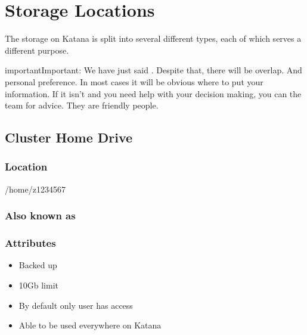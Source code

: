 \documentclass[letterpaper,10pt,english]{sphinxmanual}
\begin{document}
\section{Storage Locations}
\label{\detokenize{storage/storage_locations:storage-locations}}\label{\detokenize{storage/storage_locations::doc}}
The storage on Katana is split into several different types, each of which serves a different purpose.

\begin{sphinxadmonition}{important}{Important:}
We have just said . Despite that, there will be overlap. And personal preference. In most cases it will be obvious where to put your information. If it isn’t and you need help with your decision making, you can  the  team for advice. They are friendly people.
\end{sphinxadmonition}


\subsection{Cluster Home Drive}
\label{\detokenize{storage/storage_locations:cluster-home-drive}}

\subsubsection{Location}
\label{\detokenize{storage/storage_locations:location}}
\begin{sphinxVerbatim}[commandchars=\\\{\}]
/home/z1234567
\end{sphinxVerbatim}


\subsubsection{Also known as}
\label{\detokenize{storage/storage_locations:also-known-as}}
\begin{sphinxVerbatim}[commandchars=\\\{\}]
\end{sphinxVerbatim}


\subsubsection{Attributes}
\label{\detokenize{storage/storage_locations:attributes}}\begin{itemize}
\item {} 
Backed up

\item {} 
10Gb limit

\item {} 
By default only user has access

\item {} 
Able to be used everywhere on Katana

\end{itemize}
\end{document}
